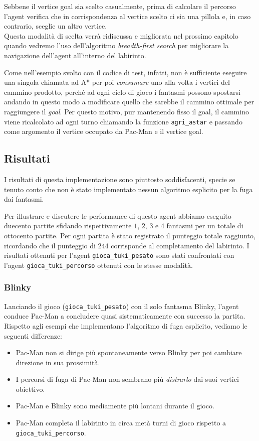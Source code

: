 \documentclass[8pt]{book}
\begin{document}
Sebbene il vertice goal sia scelto casualmente, prima di calcolare il percorso l'agent verifica che in corrispondenza al vertice scelto ci sia una pillola e, in caso contrario, sceglie un altro vertice.\\
Questa modalità di scelta verrà ridiscussa e migliorata nel prossimo capitolo quando vedremo l'uso dell'algoritmo \emph{breadth-first search} per migliorare la navigazione dell'agent all'interno del labirinto.

Come nell'esempio svolto con il codice di test, infatti, non è sufficiente eseguire una singola chiamata ad A* per poi \emph{consumare} uno alla volta i vertici del cammino prodotto, perché ad ogni ciclo di gioco i fantasmi possono spostarsi andando in questo modo a modificare quello che sarebbe il cammino ottimale per raggiungere il \emph{goal}. Per questo motivo, pur mantenendo fisso il goal, il cammino viene ricalcolato ad ogni turno chiamando la funzione \texttt{agri\_astar} e passando come argomento il vertice occupato da Pac-Man e il vertice goal.

\subsection{Risultati}

I risultati di questa implementazione sono piuttosto soddisfacenti, specie se tenuto conto che non è stato implementato nessun algoritmo esplicito per la fuga dai fantasmi.

Per illustrare e discutere le performance di questo agent abbiamo eseguito duecento partite sfidando rispettivamente $1$, $2$, $3$ e $4$ fantasmi per un totale di ottocento partite. Per ogni partita è stato registrato il punteggio totale raggiunto, ricordando che il punteggio di $244$ corrisponde al completamento del labirinto. I risultati ottenuti per l'agent \texttt{gioca\_tuki\_pesato} sono stati confrontati con l'agent \texttt{gioca\_tuki\_percorso} ottenuti con le stesse modalità.

\subsubsection{Blinky}

Lanciando il gioco (\texttt{gioca\_tuki\_pesato}) con il solo fantasma Blinky, l'agent conduce Pac-Man a concludere quasi sistematicamente con successo la partita. Rispetto agli esempi che implementano l'algoritmo di fuga esplicito, vediamo le seguenti differenze:

\begin{itemize}
\item
  Pac-Man non si dirige più spontaneamente verso Blinky per poi cambiare direzione in sua prossimità.
\item
  I percorsi di fuga di Pac-Man non sembrano più \emph{distrarlo} dai suoi vertici obiettivo.
\item
  Pac-Man e Blinky sono mediamente più lontani durante il gioco.
\item
  Pac-Man completa il labirinto in circa metà turni di gioco rispetto a \texttt{gioca\_tuki\_percorso}.
\end{itemize}
\end{document}
